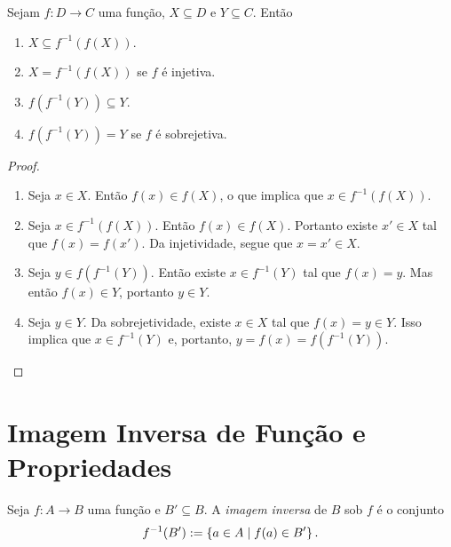 \begin{prop}
Sejam $f: D \to C$ uma função, $X \subseteq D$ e $Y \subseteq C$. Então
	\begin{enumerate}
	\item $X \subseteq f^{-1}(f(X))$.
	\item $X = f^{-1}(f(X))$ se $f$ é injetiva.
	\item $f(f^{-1}(Y)) \subseteq Y$.
	\item $f(f^{-1}(Y)) = Y$ se $f$ é sobrejetiva.
	\end{enumerate}
\end{prop}
\begin{proof}
	\begin{enumerate}
	\item Seja $x \in X$. Então $f(x) \in f(X)$, o que implica que $x \in f^{-1}(f(X))$.
	
	\item Seja $x \in f^{-1}(f(X))$. Então $f(x) \in f(X)$. Portanto existe $x' \in X$ tal que $f(x)=f(x')$. Da injetividade, segue que $x=x' \in X$.
	
	\item Seja $y \in f(f^{-1}(Y))$. Então existe $x \in f^{-1}(Y)$ tal que $f(x)=y$. Mas então $f(x) \in Y$, portanto $y \in Y$.
	
	\item Seja $y \in Y$. Da sobrejetividade, existe $x \in X$ tal que $f(x)=y \in Y$. Isso implica que $x \in f^{-1}(Y)$ e, portanto, $y=f(x)=f(f^{-1}(Y))$.
	\end{enumerate}
\end{proof}

\section{Imagem Inversa de Função e Propriedades}

\begin{defi}
	Seja $f: A \to B$ uma função e $B' \subseteq B$. A \emph{imagem inversa} de $B$ sob $f$ é o conjunto
	\begin{equation*}
	f^{-1}(B') := \left\{a \in A \;\middle\vert\; f(a) \in B' \right\}.
	\end{equation*}
\end{defi}

